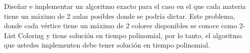Diseñar e implementar un algoritmo exacto para el caso en el que cada materia tiene un máximo
de 2 aulas posibles donde se podría dictar. Este problema, donde cada vértice tiene un máximo de
2 colores disponibles se conoce como 2-List Coloring y tiene solución en tiempo polinomial, por lo
tanto, el algoritmo que ustedes implementen debe tener solución en tiempo polinomial.